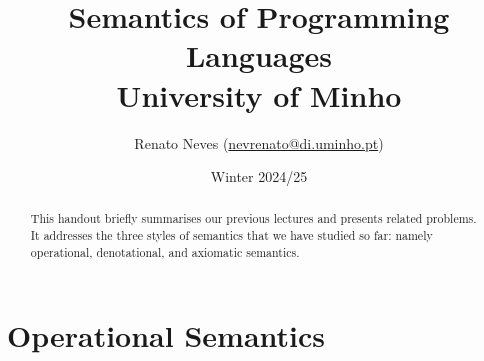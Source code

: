 \documentclass[a4paper, 11pt]{article}
\date{Winter 2024/25}
\theoremstyle{definition}
\begin{document}
\allowdisplaybreaks[2]
\title{\large{Semantics of Programming Languages}
        \\ \large{University of Minho} 
}

\author{\small{Renato Neves} \small
(\href{mailto:nevrenato@di.uminho.pt}{nevrenato@di.uminho.pt})}
\maketitle

\begin{abstract}
This handout briefly summarises our previous lectures and presents related
problems.  It addresses the three styles of semantics that we have studied so
far: namely operational, denotational, and axiomatic semantics.
\end{abstract}

\section{Operational Semantics}
\end{document}
